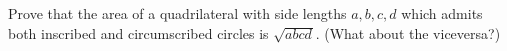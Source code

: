 Prove that the area of a quadrilateral with side lengths $a, b, c, d$
which admits both inscribed and circumscribed circles is $\sqrt{a b c d \mspace{1mu}}$.
\newline (What about the viceversa?)
